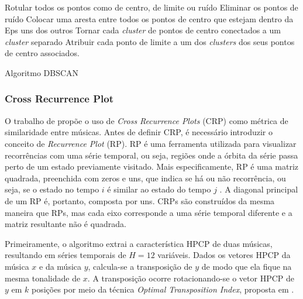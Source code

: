 \begin{itemize}
    \begin{algorithm}[!htb]
        \SetAlgoLined
        Rotular todos os pontos como de centro, de limite ou ruído\;
        Eliminar os pontos de ruído\;
        Colocar uma aresta entre todos os pontos de centro que estejam dentro da Eps uns dos outros\;
        Tornar cada \textit{cluster} de pontos de centro conectados a um \textit{cluster} separado\;
        Atribuir cada ponto de limite a um dos \textit{clusters} dos seus pontos de centro associados.
    \caption{Algoritmo DBSCAN}
    \label{alg:dbscan}
    \end{algorithm}
    
\end{itemize}

\subsubsection{Cross Recurrence Plot} \label{subsubsec:crossRecurrencePlot}
O trabalho de  propõe o uso de \textit{Cross Recurrence Plots} (CRP) como métrica de similaridade entre músicas. Antes de definir CRP, é necessário introduzir o conceito de \textit{Recurrence Plot} (RP). RP é uma ferramenta utilizada para visualizar recorrências com uma série temporal, ou seja, regiões onde a órbita da série passa perto de um estado previamente visitado. Mais especificamente, RP é uma matriz quadrada, preenchida com zeros e uns, que indica se há ou não recorrência, ou seja, se o estado no tempo \({i}\) é similar ao estado do tempo \({j}\) \cite{eckmann1987, alligood1996}. A diagonal principal de um RP é, portanto, composta por uns. CRPs são construídos da mesma maneira que RPs, mas cada eixo corresponde a uma série temporal diferente e a matriz resultante não é quadrada.

Primeiramente, o algoritmo extrai a característica HPCP \cite{gomez2006} de duas músicas, resultando em séries temporais de \({H = 12}\) variáveis. Dados os vetores HPCP da música \textbf{\({x}\)} e da música \textbf{\({y}\)}, calcula-se a transposição de \textbf{\({y}\)} de modo que ela fique na mesma tonalidade de \textbf{\({x}\)}. A transposição ocorre rotacionando-se o vetor HPCP de \textbf{\({y}\)} em \({k}\) posições por meio da técnica \textit{Optimal Transposition Index}, proposta em \cite{serra2009}.

